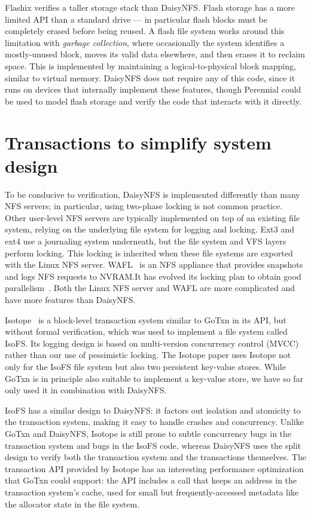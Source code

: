 Flashix verifies a taller
storage stack than DaisyNFS. Flash storage has a more limited API than a
standard drive --- in particular flash blocks must be completely erased before
being reused. A flash file system works around this limitation with \emph{garbage
collection}, where occasionally the system identifies a mostly-unused block,
moves its valid data elsewhere, and then erases it to reclaim space. This is
implemented by maintaining a logical-to-physical block mapping, similar to
virtual memory. DaisyNFS does not require any of this code, since it runs on
devices that internally implement these features, though Perennial could be used
to model flash storage and verify the code that interacts with it directly.


\section{Transactions to simplify system design}
\label{sec:rel:txn}

To be conducive to verification, DaisyNFS is implemented differently than
many NFS servers; in particular, using two-phase locking is not common
practice.  Other user-level NFS servers are typically implemented on
top of an existing file system, relying on the underlying file system
for logging and locking. Ext3 and ext4 use a journaling system underneath, but
the file system and VFS layers perform locking. This locking is inherited when
these file systems are exported with the Linux NFS server. WAFL~\cite{wafl:hitz}
is an NFS appliance that provides snapshots and logs NFS requests to
NVRAM.\@  It has evolved its locking plan to obtain good
parallelism~\cite{curtis:wafl}.  Both the Linux NFS server and WAFL
are more complicated and have more features than DaisyNFS.\@

Isotope~\cite{shin:isotope} is a block-level transaction system similar to GoTxn
in its API, but without formal verification, which was used to implement a file
system called IsoFS. Its logging design is based on
multi-version concurrency control (MVCC)~\cite{bernstein:concurrency-dbs} rather than our use of pessimistic
locking. The Isotope paper uses Isotope not only for the IsoFS file system but
also two persistent key-value stores. While GoTxn is in principle also suitable to implement a
key-value store, we have so far only used it in combination with DaisyNFS.\@

IsoFS has a similar design to DaisyNFS: it factors out isolation and atomicity to the transaction
system, making it easy to handle crashes and concurrency. Unlike GoTxn and
DaisyNFS, Isotope is still prone to subtle concurrency bugs in the transaction
system and bugs in the IsoFS code, whereas DaisyNFS uses the split design to
verify both the transaction system and the transactions themselves. The transaction API provided
by Isotope has an interesting performance optimization that GoTxn could support:
the API includes a  call that keeps an address in the
transaction system's cache, used for small but frequently-accessed metadata like
the allocator state in the file system.
